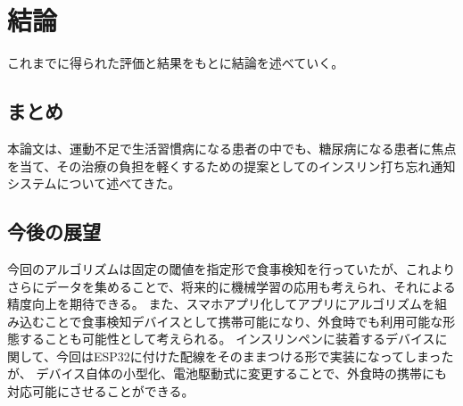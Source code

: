 \chapter{結論}
\label{chap:conclusion}

これまでに得られた評価と結果をもとに結論を述べていく。

\section{まとめ}
\label{section:conclusion_sum}

本論文は、運動不足で生活習慣病になる患者の中でも、糖尿病になる患者に焦点を当て、その治療の負担を軽くするための提案としてのインスリン打ち忘れ通知システムについて述べてきた。



\section{今後の展望}

今回のアルゴリズムは固定の閾値を指定形で食事検知を行っていたが、これよりさらにデータを集めることで、将来的に機械学習の応用も考えられ、それによる精度向上を期待できる。
また、スマホアプリ化してアプリにアルゴリズムを組み込むことで食事検知デバイスとして携帯可能になり、外食時でも利用可能な形態することも可能性として考えられる。
インスリンペンに装着するデバイスに関して、今回はESP32に付けた配線をそのままつける形で実装になってしまったが、
デバイス自体の小型化、電池駆動式に変更することで、外食時の携帯にも対応可能にさせることができる。
